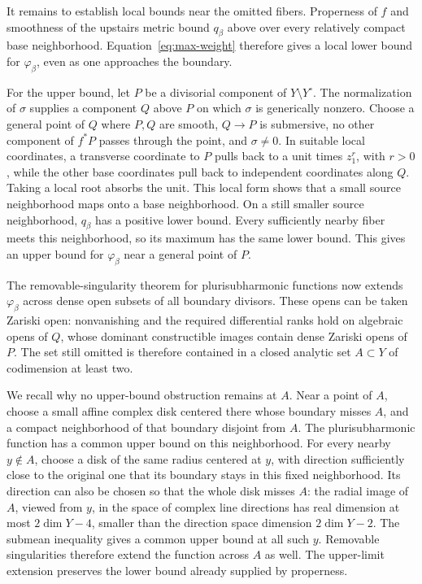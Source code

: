 It remains to establish local bounds near the omitted fibers.
Properness of \(f\) and smoothness of the upstairs metric bound
\(q_\beta\) above over every relatively compact base neighborhood.
Equation~\eqref{eq:max-weight} therefore gives a local lower bound
for \(\varphi_\beta\), even as one approaches the boundary.

For the upper bound, let \(P\) be a divisorial component of
\(Y\setminus Y^\circ\). The normalization of \(\sigma\) supplies
a component \(Q\) above \(P\) on which \(\sigma\) is generically
nonzero. Choose a general point of \(Q\) where \(P,Q\) are smooth,
\(Q\to P\) is submersive, no other component of \(f^*P\) passes
through the point, and \(\sigma\ne0\). In suitable local coordinates, a
transverse coordinate to \(P\) pulls back to a unit times \(z_1^r\),
with \(r>0\), while the other base coordinates pull back to independent
coordinates along \(Q\). Taking a local root absorbs the unit.
This local form shows that a small source neighborhood maps onto a
base neighborhood. On a still smaller source neighborhood,
\(q_\beta\) has a positive lower bound. Every sufficiently nearby
fiber meets this neighborhood, so its maximum has the same lower
bound. This gives an upper bound for \(\varphi_\beta\) near a
general point of \(P\).

The removable-singularity theorem for plurisubharmonic functions now
extends \(\varphi_\beta\) across dense open subsets of all boundary
divisors. These opens can be taken Zariski open: nonvanishing and the
required differential ranks hold on algebraic opens of \(Q\), whose
dominant constructible images contain dense Zariski opens of \(P\).
The set still omitted is therefore contained in a closed analytic set
\(A\subset Y\) of codimension at least two.

We recall why no upper-bound obstruction remains at \(A\). Near a
point of \(A\), choose a small affine complex disk centered there whose
boundary misses \(A\), and a compact neighborhood of that boundary disjoint
from \(A\). The plurisubharmonic function has a common upper bound
on this neighborhood. For every nearby \(y\notin A\), choose a disk
of the same radius centered at \(y\), with direction sufficiently
close to the original one that its boundary stays in this fixed
neighborhood. Its direction can also be chosen so that the whole
disk misses \(A\):
the radial image of \(A\), viewed from \(y\), in the space of complex line directions
has real dimension at most \(2\dim Y-4\), smaller than the direction
space dimension \(2\dim Y-2\). The submean inequality gives
a common upper bound at all such \(y\). Removable singularities
therefore extend the function across \(A\) as well. The upper-limit
extension preserves the lower bound already supplied by properness.

